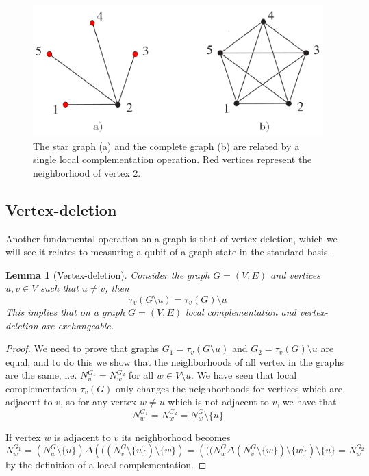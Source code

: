 \documentclass[10pt,a4paper]{book}
\numberwithin{equation}{chapter}
\numberwithin{figure}{chapter}
\numberwithin{table}{chapter}
\newtheorem{lemma}{Lemma}[section]
\begin{document}
\begin{figure}[H]
    \begin{center}
        \includegraphics[scale=0.6]{LC.png}
    \end{center}
    \caption{\footnotesize The star graph (a) and the complete graph (b) are related by a single local complementation operation. Red vertices represent the neighborhood of vertex $2$.}
    \label{figLC}
\end{figure}
\subsection{Vertex-deletion}
Another fundamental operation on a graph is that of vertex-deletion, which we will see it relates to measuring a qubit of a graph state in the standard basis. 
\begin{lemma}[Vertex-deletion] Consider the graph $G=(V,E)$ and vertices $u,v \in V$ such that $u\neq v$, then
\begin{equation}
\tau_{v}(G\setminus u)=\tau_{v}(G)\setminus u
\end{equation}
This implies that on a graph $G=(V,E)$ local complementation and vertex-deletion are exchangeable.
\label{vertex}
\end{lemma}
\begin{proof} We need to prove that graphs $G_1 =\tau_{v}(G \setminus u)$ and $G_2 =\tau_{v}(G)\setminus u$ are equal, and to do this we show that the neighborhoods of all vertex in the graphs are the same, i.e. $N^{G_1}_w = N^{G_2}_w $ for all $w \in V \setminus u$. We have seen that local complementation $\tau_{v}(G)$ only changes the neighborhoods for vertices which are adjacent to $v$, so for any vertex $w \neq u$ which is not adjacent to $v$, we have that
\begin{equation}
N^{G_1}_w =N^{G_2}_w =N^{G}_w \setminus \lbrace u \rbrace
\end{equation}

If vertex $w$ is adjacent to $v$ its neighborhood becomes
\begin{equation}
N^{G_1}_w = (N^{G}_w \setminus \lbrace u \rbrace )\Delta \left(( (N^{G}_v \setminus \lbrace u \rbrace ) \setminus \lbrace w \rbrace \right)= \left(( (N^{G}_w \Delta (N^{G}_v \setminus \lbrace w \rbrace ) \setminus \lbrace w \rbrace \right) \setminus \lbrace u \rbrace =N^{G_2}_w 
\end{equation}
by the definition of a local complementation.
\end{proof}
\end{document}
